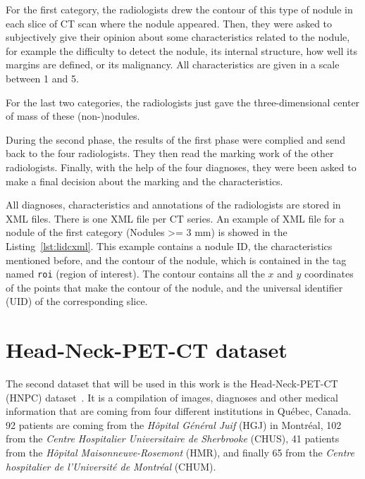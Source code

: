 For the first category, the radiologists drew the contour of this type of nodule in each slice of CT scan where the nodule appeared. Then, they were asked to subjectively give their opinion about some characteristics related to the nodule, for example the difficulty to detect the nodule, its internal structure, how well its margins are defined, or its malignancy. All characteristics are given in a scale between 1 and 5.

For the last two categories, the radiologists just gave the three-dimensional center of mass of these (non-)nodules.

\newpage
During the second phase, the results of the first phase were complied and send back to the four radiologists. They then read the marking work of the other radiologists. Finally, with the help of the four diagnoses, they were been asked to make a final decision about the marking and the characteristics.

All diagnoses, characteristics and annotations of the radiologists are stored in XML files. There is one XML file per CT series. An example of XML file for a nodule of the first category (Nodules >= 3 mm) is showed in the Listing~\ref{lst:lidcxml}. This example contains a nodule ID, the characteristics mentioned before, and the contour of the nodule, which is contained in the tag named \texttt{roi} (region of interest). The contour contains all the $x$ and $y$ coordinates of the points that make the contour of the nodule, and the universal identifier (UID) of the corresponding slice.



\newpage
\section{Head-Neck-PET-CT dataset}
The second dataset that will be used in this work is the Head-Neck-PET-CT (HNPC) dataset~\cite{vallieres_data_2017}. It is a compilation of images, diagnoses and other medical information that are coming from four different institutions in Québec, Canada. 92 patients are coming from the \emph{Hôpital Général Juif} (HGJ) in Montréal, 102 from the \emph{Centre Hospitalier Universitaire de Sherbrooke} (CHUS), 41 patients from the \emph{Hôpital Maisonneuve-Rosemont} (HMR), and finally 65 from the \emph{Centre hospitalier de l’Université de Montréal} (CHUM).

